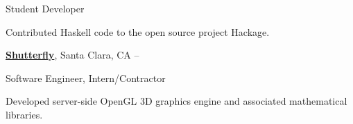 \documentclass[letterpaper,MMMyyyy,nonstopmode]{simpleresumecv}
\begin{document}
\begin{Body}
\Gap
\BulletItem
Student Developer

\begin{Detail}
\SubBulletItem
Contributed Haskell code to the open source project Hackage.
\end{Detail}


\BigGap
\Entry
\href{http://www.shutterfly.com/}
{\textbf{Shutterfly}},
Santa Clara, CA
\hfill
{} --

\Gap
\BulletItem
Software Engineer, Intern/Contractor
\begin{Detail}
\SubBulletItem
Developed server-side OpenGL 3D graphics engine and associated mathematical libraries.
\end{Detail}



\end{Body}
\end{document}
